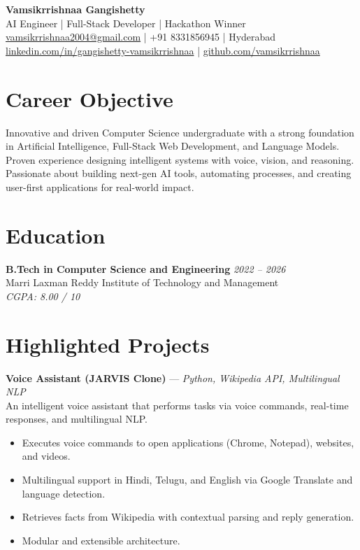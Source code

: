 \documentclass[9.5pt,a4paper]{article} %
\begin{document}
\begin{center}
    {\LARGE \textbf{Vamsikrrishnaa Gangishetty}} \\
    \vspace{0.2em}
    AI Engineer \quad | \quad Full-Stack Developer \quad | \quad Hackathon Winner \\
    \vspace{0.4em}
    \href{mailto:vamsikrrishnaa2004@gmail.com}{vamsikrrishnaa2004@gmail.com} \quad | \quad +91 8331856945 \quad | \quad Hyderabad \\
    \href{https://linkedin.com/in/gangishetty-vamsikrrishnaa}{linkedin.com/in/gangishetty-vamsikrrishnaa} \quad | \quad \href{https://github.com/vamsikrrishnaa}{github.com/vamsikrrishnaa}
\end{center}

\section*{Career Objective}
Innovative and driven Computer Science undergraduate with a strong foundation in Artificial Intelligence, Full-Stack Web Development, and Language Models. Proven experience designing intelligent systems with voice, vision, and reasoning. Passionate about building next-gen AI tools, automating processes, and creating user-first applications for real-world impact.

\section*{Education}
\textbf{B.Tech in Computer Science and Engineering} \hfill \textit{2022 – 2026} \\
Marri Laxman Reddy Institute of Technology and Management \\
\textit{CGPA: 8.00 / 10}

\section*{Highlighted Projects}

\textbf{Voice Assistant (JARVIS Clone)} — \textit{Python, Wikipedia API, Multilingual NLP} \\
An intelligent voice assistant that performs tasks via voice commands, real-time responses, and multilingual NLP.
\begin{itemize}
    \item Executes voice commands to open applications (Chrome, Notepad), websites, and videos.
    \item Multilingual support in Hindi, Telugu, and English via Google Translate and language detection.
    \item Retrieves facts from Wikipedia with contextual parsing and reply generation.
    \item Modular and extensible architecture.
\end{itemize}
\end{document}
